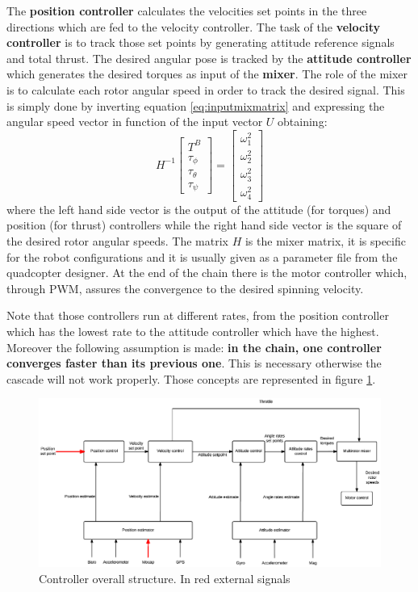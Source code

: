 The \textbf{position controller} calculates the velocities set points in the three directions which are fed to the velocity controller. The task of the \textbf{velocity controller} is to track those set points by generating attitude reference signals and total thrust. The desired angular pose is tracked by the \textbf{attitude controller} which generates the desired torques as input of the \textbf{mixer}. The role of the mixer is to calculate each rotor angular speed in order to track the desired signal. This is simply done by inverting equation \ref{eq:inputmixmatrix} and expressing the angular speed vector in function of the input vector $U$ obtaining:\begin{equation}
H^{-1}\begin{bmatrix}
T^B\\\tau_\phi\\\tau_\theta\\\tau_\psi
\end{bmatrix} = \begin{bmatrix}
\omega_1^2\\\omega_2^2\\\omega_3^2\\\omega_4^2
\end{bmatrix}
\end{equation}
where the left hand side vector is the output of the attitude (for torques) and position (for thrust) controllers while the right hand side vector is the square of the desired rotor angular speeds. The matrix $H$ is the mixer matrix, it is specific for the robot configurations and it is usually given as a parameter file from the quadcopter designer. At the end of the chain there is the motor controller which, through PWM, assures the convergence to the desired spinning velocity. 

Note that those controllers run at different rates, from the position controller which has the lowest rate to the attitude controller which have the highest. Moreover the following assumption is made: \textbf{in the chain, one controller converges faster than its previous one}. This is necessary otherwise the cascade will not work properly. Those concepts are represented in figure \ref{figure:controlarch}.

\begin{figure}[h]
	\centering
	\noindent
	\includegraphics[width=1\textwidth]{arch.eps}
	\caption{Controller overall structure. In red external signals}
	\label{figure:controlarch}
\end{figure}

